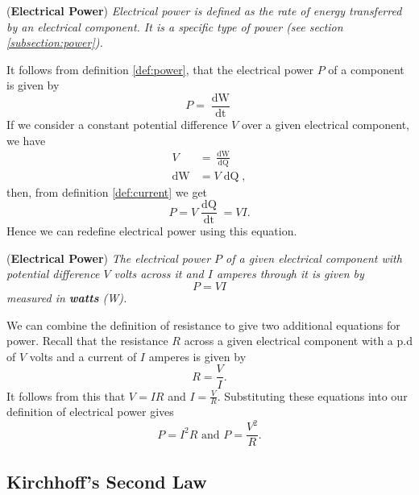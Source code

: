 \begin{definition}{(\textbf{Electrical Power})}
\textit{Electrical power is defined as the rate of energy transferred by an electrical component. It is a specific type of power (see section \ref{subsection:power}).}
\end{definition}
It follows from definition \ref{def:power}, that the electrical power $P$ of a component is given by 
\begin{equation*}
    P = \frac{\mathop{\mathrm{d}W}}{\mathop{\mathrm{d}t}} 
\end{equation*}
If we consider a constant potential difference $V$ over a given electrical component, we have 
\begin{align*}
    V &= \frac{\mathop{\mathrm{d}W}}{\mathop{\mathrm{d}Q}} \\
    \mathop{\mathrm{d}W} &= V \mathop{\mathrm{d}Q},
\end{align*}
then, from definition \ref{def:current} we get
\begin{equation*}
    P = V \frac{\mathop{\mathrm{d}Q}}{\mathop{\mathrm{d}t}} = VI.
\end{equation*}
Hence we can redefine electrical power using this equation. 

\begin{definition}{(\textbf{Electrical Power})}
\textit{The electrical power $P$ of a given electrical component with potential difference $V$ volts across it and $I$ amperes through it is given by}
\begin{equation}
    P = VI
    \label{eq:power-IV}
\end{equation}
\textit{measured in \textbf{watts} (W).}
\end{definition}

We can combine the definition of resistance to give two additional equations for power. Recall that the resistance $R$ across a given electrical component with a p.d of $V$ volts and a current of $I$ amperes is given by
\begin{equation*}
    R = \frac{V}{I}.
\end{equation*}
It follows from this that $V = IR$ and $I = \frac{V}{R}$. Substituting these equations  into our definition of electrical power gives
\begin{equation}
    \label{eq:power-I2R}
    P = I^2 R \text{ and } P = \frac{V^2}{R}.
\end{equation}

\subsection{Kirchhoff's Second Law}

